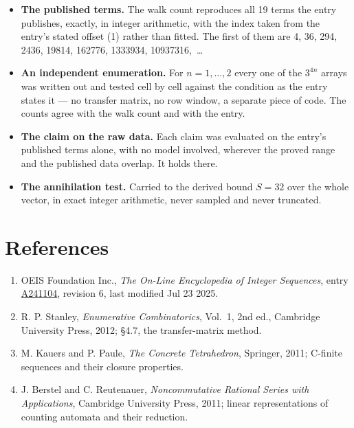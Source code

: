 \documentclass[11pt]{article}
\theoremstyle{definition}
\begin{document}
\begin{itemize}

\item {\bfseries The published terms.} The walk count reproduces all 19 terms the entry publishes, exactly, in integer arithmetic, with the index taken from the entry's stated offset (1) rather than fitted. The first of them are 4, 36, 294, 2436, 19814, 162776, 1333934, 10937316,~\dots

\item {\bfseries An independent enumeration.} For $n = 1,\dots,2$ every one of the $3^{4n}$ arrays was written out and tested cell by cell against the condition as the entry states it --- no transfer matrix, no row window, a separate piece of code. The counts agree with the walk count and with the entry.

\item {\bfseries The claim on the raw data.} Each claim was evaluated on the entry's published terms alone, with no model involved, wherever the proved range and the published data overlap. It holds there.

\item {\bfseries The annihilation test.} Carried to the derived bound $S = 32$ over the whole vector, in exact integer arithmetic, never sampled and never truncated.

\end{itemize}

\section{References}

\begin{enumerate}

\item OEIS Foundation Inc., \emph{The On-Line Encyclopedia of Integer Sequences}, entry \href{https://oeis.org/A241104}{A241104}, revision 6, last modified Jul 23 2025.

\item R. P. Stanley, \emph{Enumerative Combinatorics}, Vol.~1, 2nd ed., Cambridge University Press, 2012; \S4.7, the transfer-matrix method.

\item M. Kauers and P. Paule, \emph{The Concrete Tetrahedron}, Springer, 2011; C-finite sequences and their closure properties.

\item J. Berstel and C. Reutenauer, \emph{Noncommutative Rational Series with Applications}, Cambridge University Press, 2011; linear representations of counting automata and their reduction.

\end{enumerate}
\end{document}
